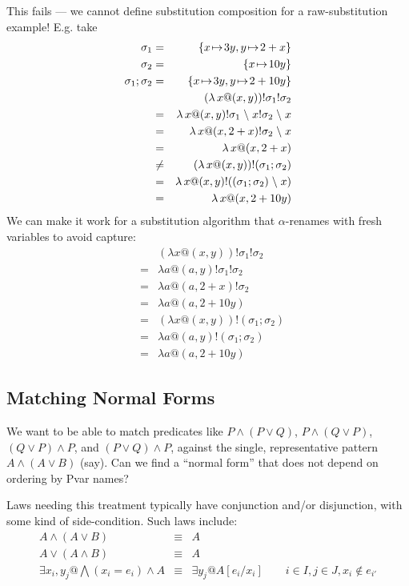 This fails --- we cannot define substitution composition for a
raw-substitution example!
E.g. take
\begin{eqnarray*}
   \sigma_1 &=& \mapof{x \to 3y, y \to 2+x}
\\ \sigma_2 &=& \mapof{x \to 10y}
\\ \sigma_1;\sigma_2 &=& \mapof{x \to 3y, y \to 2+10y}
\\  && (\lambda x @ (x,y))!\sigma_1!\sigma_2
\\ &=& \lambda x @ (x,y)!\sigma_1\hide x ! \sigma_2 \hide x
\\ &=& \lambda x @ (x,2+x) ! \sigma_2 \hide x
\\ &=& \lambda x @ (x,2+x)
\\ &\not=& (\lambda x @ (x,y))!(\sigma_1;\sigma_2)
\\ &=& \lambda x @ (x,y)!((\sigma_1;\sigma_2)\hide x)
\\ &=& \lambda x @ (x,2+10y)
\end{eqnarray*}
We can make it work for a substitution algorithm that
$\alpha$-renames with fresh variables to avoid capture:
\begin{eqnarray*}
    && (\lambda x @ (x,y))!\sigma_1!\sigma_2
\\ &=& \lambda a @ (a,y)!\sigma_1!\sigma_2
\\ &=& \lambda a @ (a,2+x)!\sigma_2
\\ &=& \lambda a @ (a,2+10y)
\\ &=& (\lambda x @ (x,y))!(\sigma_1;\sigma_2)
\\ &=& \lambda a @ (a,y) ! (\sigma_1;\sigma_2)
\\ &=& \lambda a @ (a,2+10y)
\end{eqnarray*}


\newpage
\subsection{Matching Normal Forms}

We want to be able to match predicates like
$P\land(P\lor Q)$,
$P\land(Q\lor P)$,
$(Q\lor P)\land P$,
and $(P\lor Q)\land P$,
against the single, representative pattern $A \land (A \lor B)$ (say).
Can we find a ``normal form'' that does not depend
on ordering by Pvar names?

Laws needing this treatment typically have conjunction and/or disjunction,
with some kind of side-condition.
Such laws include:
\begin{eqnarray*}
   A \land (A \lor B) &\equiv& A
\\ A \lor (A \land B) &\equiv& A
\\ \exists x_i,y_j @ \bigwedge(x_i=e_i) \land A
   &\equiv&
   \exists y_j @ A[e_i/x_i]
   \qquad i \in I, j \in J, x_i \notin e_{i'}
\end{eqnarray*}
